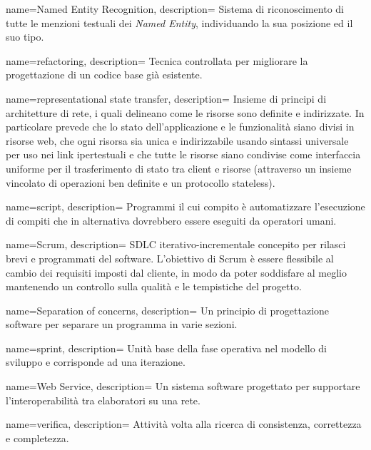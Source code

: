  {
name=Named Entity Recognition,
description={
Sistema di riconoscimento di tutte le menzioni testuali dei
\textit{Named Entity}, individuando la sua posizione ed il suo tipo.
}
}

 {
name=refactoring,
description={
Tecnica controllata per migliorare la progettazione di un codice base già
esistente.
}
}

 {
name=representational state transfer,
description={
Insieme di principi di architetture di rete, i quali delineano come le risorse
sono definite e indirizzate. In particolare prevede che lo stato
dell’applicazione e le funzionalità siano divisi in risorse web, che ogni
risorsa sia unica e indirizzabile usando sintassi universale per uso nei link
ipertestuali e che tutte le risorse siano condivise come interfaccia uniforme
per il trasferimento di stato tra client e risorse (attraverso un insieme
vincolato di operazioni ben definite e un protocollo stateless).
}
}

 {
name=script,
description={
Programmi il cui compito è automatizzare l'esecuzione di compiti che in
alternativa dovrebbero essere eseguiti da operatori umani.
}
}

 {
name=Scrum,
description={
SDLC iterativo-incrementale concepito per rilasci brevi e programmati del
software. L'obiettivo di Scrum è essere flessibile al cambio dei requisiti
imposti dal cliente, in modo da poter soddisfare al meglio mantenendo un
controllo sulla qualità e le tempistiche del progetto.
}
}

 {
name=Separation of concerns,
description={
Un principio di progettazione software per separare un programma in varie
sezioni.
}
}

 {
name=sprint,
description={
Unità base della fase operativa nel modello di sviluppo  e
corrisponde ad una iterazione.
}
}

 {
name=Web Service,
description={
Un sistema software progettato per supportare l'interoperabilità tra elaboratori
su una rete.
}
}

 {
name=verifica,
description={
Attività volta alla ricerca di consistenza, correttezza e completezza.
}
}

\makeglossaries

